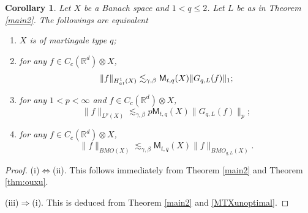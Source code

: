 \documentclass[oneside,english,a4wide]{amsart}
\numberwithin{equation}{section}
\numberwithin{figure}{section}
\theoremstyle{plain}
\theoremstyle{plain}
\newtheorem{corollary}[thm]{Corollary}
\theoremstyle{definition}
\theoremstyle{plain}
\theoremstyle{remark}
\theoremstyle{definition}
\theoremstyle{remark}
\theoremstyle{definition}
\newcommand{\real}{{\mathbb R}}
\newcommand{\8}{+\infty}
\renewcommand{\1}{\mathbbm{1}}
\newcommand{\at}{{\rm at}}
\begin{document}
{\begin{corollary}\label{cor:strong}
    Let $X$ be a Banach space and $1 < q \leq 2$. Let $L$ be as in Theorem \ref{main2}. The followings are equivalent
    \begin{enumerate}[{\rm (i)}]
        \item $X$ is of martingale type $q$;
        \item for any $f \in C_c(\real^d)\otimes X$, 
        \[
            \| f \|_{H^1_{\at}(X) } \lesssim_{\gamma, \beta} \mathsf{M}_{t, q}(X)\| G_{q, L}(f) \|_1;
        \]
        \item for any $1<p<\infty$ and $f \in C_c(\real^d)\otimes X$,
        \[
            \| f  \|_{L^p(X)} \lesssim_{\gamma, \beta} p \mathsf{M}_{t, q}(X)\| G_{q, L}(f) \|_p;
        \]
        \item for any $f \in C_c(\real^d)\otimes X$,
        \[
            \| f \|_{BMO(X)} \lesssim_{\gamma, \beta} \mathsf{M}_{t, q}(X)\| f \|_{BMO_{q, L}(X)}.
        \]
    \end{enumerate}
\end{corollary}


\begin{proof}
(i)$\Leftrightarrow$(ii). This follows immediately from Theorem \ref{main2} and Theorem \ref{thm:ouxu}.

(iii)$\Rightarrow$(i). This is deduced from Theorem \ref{main2} and \eqref{MTXunoptimal}.


\end{proof}}
\end{document}

